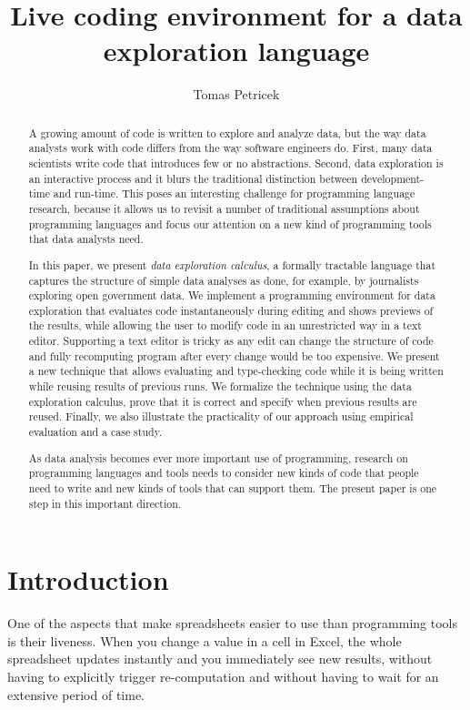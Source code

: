 \documentclass[acmsmall,anonymous,fleqn]{acmart}\settopmatter{printfolios=false,printccs=false,printacmref=false}
\title{Live coding environment for a data exploration language}
\author{Tomas Petricek}
\affiliation{
  \institution{University of Kent}
  \country{United Kingdom}
}
\theoremstyle{plain}
\theoremstyle{definition}
\begin{document}
\begin{abstract}

A growing amount of code is written to explore and analyze data, but the way data analysts
work with code differs from the way software engineers do. First, many data
scientists write code that introduces few or no abstractions. Second, data exploration is an
interactive process and it blurs the traditional distinction between development-time and run-time.
This poses an interesting challenge for programming language research, because it allows us to
revisit a number of traditional assumptions about programming languages and focus our attention
on a new kind of programming tools that data analysts need.

In this paper, we present \emph{data exploration calculus}, a formally tractable
language that captures the structure of simple data analyses as done, for example, by journalists
exploring open government data. We implement a programming environment for data exploration that
evaluates code instantaneously during editing and shows previews of the results,
while allowing the user to modify code in an unrestricted way in a text
editor. Supporting a text editor is tricky as any edit can change the structure
of code and fully recomputing program after every change would be too expensive.
We present a new technique that allows evaluating and type-checking code while it is
being written while reusing results of previous runs. We formalize the technique using the data
exploration calculus, prove that it is correct and specify when previous results are reused.
Finally, we also illustrate the practicality of our approach using empirical evaluation
and a case study.

As data analysis becomes ever more important use of programming, research on programming languages
and tools needs to consider new kinds of code that people need to write and new kinds of tools
that can support them. The present paper is one step in this important direction.
\end{abstract}
\maketitle


\section{Introduction}
\label{sec:intro}
One of the aspects that make spreadsheets easier to use than programming tools is their
liveness. When you change a value in a cell in Excel, the whole spreadsheet updates instantly
and you immediately see new results, without having to explicitly trigger re-computation
and without having to wait for an extensive period of time.
\end{document}
